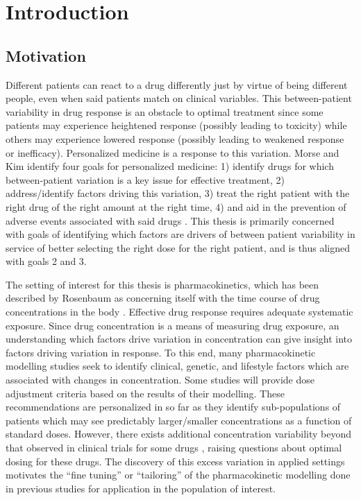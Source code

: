 \chapter{Introduction}

\section{Motivation}

Different patients can react to a drug differently just by virtue of being different people, even when said patients match on clinical variables.  This between-patient variability in drug response is an obstacle to optimal treatment since some patients may experience heightened response (possibly leading to toxicity) while others may experience lowered response (possibly leading to weakened response or inefficacy).  Personalized medicine is a response to this variation.  Morse and Kim identify four goals for personalized medicine: 1) identify drugs for which between-patient variation is a key issue for effective treatment,  2) address/identify factors driving this variation, 3) treat the right patient with the right drug  of the right amount at the right time, 4) and aid in the prevention of adverse events associated with said drugs \cite{morse2015personalized}.  This thesis is primarily concerned with goals of identifying which factors are drivers of between patient variability in service of better selecting the right dose for the right patient, and is thus aligned with goals 2 and 3.

The setting of interest for this thesis is pharmacokinetics, which has been described by Rosenbaum as concerning itself with the time course of drug concentrations in the body \cite{ rosenbaum2016basic}.
Effective drug response requires adequate systematic exposure.  Since drug concentration is a means of measuring drug exposure,  an understanding which factors drive variation in concentration can give insight into factors driving variation in response.  To this end, many pharmacokinetic modelling studies seek to identify clinical, genetic, and lifestyle factors which are associated with changes in concentration. Some studies will provide dose adjustment criteria based on the results of their modelling. These recommendations are personalized in so far as they identify sub-populations of patients which may see predictably larger/smaller concentrations as a function of standard doses. However, there exists additional concentration variability beyond that observed in clinical trials for some drugs \cite{sukumar2019apixaban}, raising questions about optimal dosing for these drugs.  The discovery of this excess variation in applied settings motivates the ``fine tuning'' or ``tailoring'' of the pharmacokinetic modelling done in previous studies for application in the population of interest.

